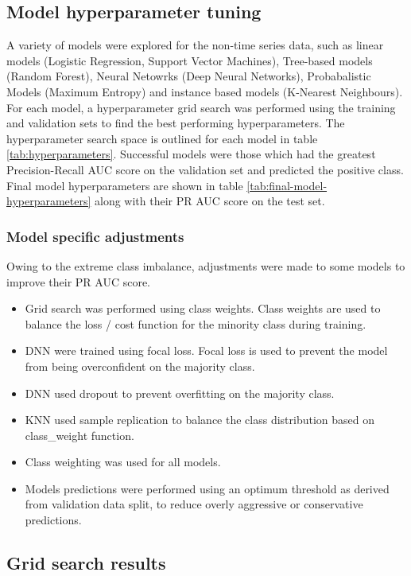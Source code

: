 \documentclass{article}
\begin{document}
\subsection{Model hyperparameter tuning}

A variety of models were explored for the non-time series data, such as linear models (Logistic Regression, Support Vector Machines), Tree-based models (Random Forest), Neural Netowrks (Deep Neural Networks), Probabalistic Models (Maximum Entropy) and instance based models (K-Nearest Neighbours).
For each model, a hyperparameter grid search was performed using the training and validation sets to find the best performing hyperparameters. The hyperparameter search space is outlined for each model in table \ref{tab:hyperparameters}. Successful models were those which had the greatest Precision-Recall AUC score on the validation set and predicted the positive class. Final model hyperparameters are shown in table \ref{tab:final-model-hyperparameters} along with their PR AUC score on the test set.

 \subsubsection{Model specific adjustments}

 Owing to the extreme class imbalance, adjustments were made to some models to improve their PR AUC score.
 \begin{itemize}
    \item Grid search was performed using class weights. Class weights are used to balance the loss / cost function for the minority class during training.
    \item DNN were trained using focal loss. Focal loss is used to prevent the model from being overconfident on the majority class.
    \item DNN used dropout to prevent overfitting on the majority class.
    \item KNN used sample replication to balance the class distribution based on class\_weight function.
     \item Class weighting was used for all models.
     \item Models predictions were performed using an optimum threshold as derived from validation data split, to reduce overly aggressive or conservative predictions.
 \end{itemize}

 \subsection{Grid search results}
\end{document}
